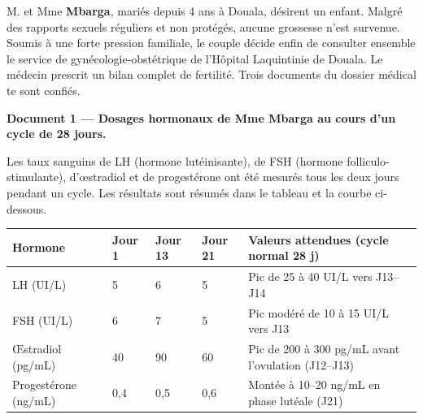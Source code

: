 \documentclass[11pt]{article}
\newcounter{popsec}
\newcounter{popsub}
\newcommand{\courssub}[1]{%
  \stepcounter{popsub}%
  \par\vspace{9pt}\noindent{\popxbold\fontsize{11.5}{13}\selectfont\color{popink}{\color{poporange}\thepopsec.\thepopsub}\hspace{6pt}#1}\par\nopagebreak\vspace{4pt}
}
\begin{document}
\courssub{Situation}

M. et Mme \textbf{Mbarga}, mariés depuis 4 ans à Douala, désirent un enfant. Malgré des rapports sexuels réguliers et non protégés, aucune grossesse n'est survenue. Soumis à une forte pression familiale, le couple décide enfin de consulter ensemble le service de gynécologie-obstétrique de l'Hôpital Laquintinie de Douala. Le médecin prescrit un bilan complet de fertilité. Trois documents du dossier médical te sont confiés.

\textbf{Document 1 — Dosages hormonaux de Mme Mbarga au cours d'un cycle de 28 jours.}

Les taux sanguins de LH (hormone lutéinisante), de FSH (hormone folliculo-stimulante), d'{\oe}stradiol et de progestérone ont été mesurés tous les deux jours pendant un cycle. Les résultats sont résumés dans le tableau et la courbe ci-dessous.

\begin{center}
\begin{tabularx}{\linewidth}{|l|X|X|X|X|}
\hline
\rowcolor{popblueL} \textbf{Hormone} & \textbf{Jour 1} & \textbf{Jour 13} & \textbf{Jour 21} & \textbf{Valeurs attendues (cycle normal 28 j)} \\
\hline
LH (UI/L) & 5 & 6 & 5 & Pic de 25 à 40 UI/L vers J13--J14 \\
\hline
FSH (UI/L) & 6 & 7 & 5 & Pic modéré de 10 à 15 UI/L vers J13 \\
\hline
{\OE}stradiol (pg/mL) & 40 & 90 & 60 & Pic de 200 à 300 pg/mL avant l'ovulation (J12--J13) \\
\hline
Progestérone (ng/mL) & 0,4 & 0,5 & 0,6 & Montée à 10--20 ng/mL en phase lutéale (J21) \\
\hline
\end{tabularx}
\end{center}
\end{document}
